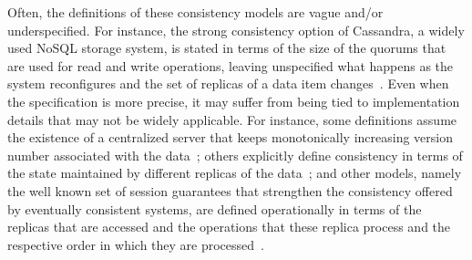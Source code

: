 \documentclass[conference]{IEEEtran}
\begin{document}
	Often, the definitions of these consistency models are vague and/or underspecified. For instance, the strong consistency option of Cassandra, a widely used NoSQL storage system, is stated in terms of the size of the quorums that are used for read and write operations, leaving unspecified what happens as the system reconfigures and the set of replicas of a data item changes~\cite{cassandra-consistency}.
	Even when the specification is more precise, it may suffer from being tied to implementation details that may not be widely applicable. For instance, some definitions assume the existence of a centralized server that keeps monotonically increasing version number associated with the data~\cite{DBLP:conf/icde/AdyaLO00}; others explicitly define consistency in terms of the state maintained by different replicas of the data~\cite{Li:2012:MGS:2387880.2387906}; and other models, namely the well known set of session guarantees that strengthen the consistency offered by eventually consistent systems, are defined operationally in terms of the replicas that are accessed and the operations that these replica process and the respective order in which they are processed~\cite{bayou}.
	
\end{document}
